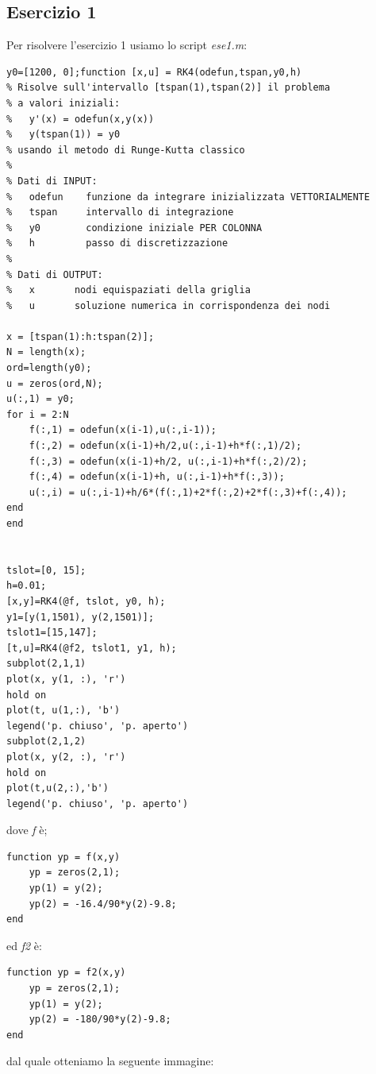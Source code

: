 \documentclass[11pt,a4paper,twoside,openright,titlepage,
headinclude,footinclude,BCOR5mm,
numbers=noenddot,cleardoublepage=empty,
tablecaptionabove]{scrbook}
\begin{document}
\subsection{Esercizio 1}
Per risolvere l'esercizio 1 usiamo lo script \emph{ese1.m}:
\begin{lstlisting}[frame=trBL]
y0=[1200, 0];function [x,u] = RK4(odefun,tspan,y0,h)
% Risolve sull'intervallo [tspan(1),tspan(2)] il problema 
% a valori iniziali:
%   y'(x) = odefun(x,y(x))
%   y(tspan(1)) = y0
% usando il metodo di Runge-Kutta classico
%
% Dati di INPUT:
%   odefun    funzione da integrare inizializzata VETTORIALMENTE
%   tspan     intervallo di integrazione
%   y0        condizione iniziale PER COLONNA
%   h         passo di discretizzazione
%
% Dati di OUTPUT:
%   x       nodi equispaziati della griglia
%   u       soluzione numerica in corrispondenza dei nodi

x = [tspan(1):h:tspan(2)];
N = length(x);
ord=length(y0);
u = zeros(ord,N);  
u(:,1) = y0;
for i = 2:N
    f(:,1) = odefun(x(i-1),u(:,i-1));
    f(:,2) = odefun(x(i-1)+h/2,u(:,i-1)+h*f(:,1)/2);
    f(:,3) = odefun(x(i-1)+h/2, u(:,i-1)+h*f(:,2)/2);
    f(:,4) = odefun(x(i-1)+h, u(:,i-1)+h*f(:,3));
    u(:,i) = u(:,i-1)+h/6*(f(:,1)+2*f(:,2)+2*f(:,3)+f(:,4));
end
end


tslot=[0, 15];
h=0.01;
[x,y]=RK4(@f, tslot, y0, h);
y1=[y(1,1501), y(2,1501)];
tslot1=[15,147];
[t,u]=RK4(@f2, tslot1, y1, h); 
subplot(2,1,1)
plot(x, y(1, :), 'r')
hold on
plot(t, u(1,:), 'b')
legend('p. chiuso', 'p. aperto')
subplot(2,1,2)
plot(x, y(2, :), 'r')
hold on
plot(t,u(2,:),'b')
legend('p. chiuso', 'p. aperto')
\end{lstlisting}
dove \emph{f} è;
\begin{lstlisting}[frame=trbl]
function yp = f(x,y)
    yp = zeros(2,1);
    yp(1) = y(2);
    yp(2) = -16.4/90*y(2)-9.8;
end
\end{lstlisting}
ed \emph{f2} è:
\begin{lstlisting}[frame=trbl]
function yp = f2(x,y)
    yp = zeros(2,1);
    yp(1) = y(2);
    yp(2) = -180/90*y(2)-9.8;
end
\end{lstlisting}
dal quale otteniamo la seguente immagine:
\end{document}
